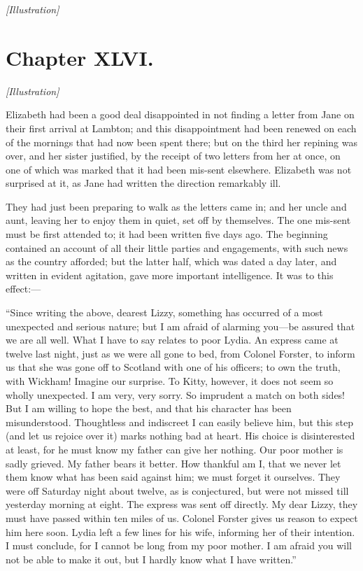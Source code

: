 \documentclass[12pt]{book}
\begin{document}
\emph{[Illustration]}

\chapter{Chapter XLVI.}

\emph{[Illustration]}

Elizabeth had been a good deal disappointed in not finding a letter from Jane on their first arrival at Lambton; and this disappointment had been renewed on each of the mornings that had now been spent there; but on the third her repining was over, and her sister justified, by the receipt of two letters from her at once, on one of which was marked that it had been mis-sent elsewhere. Elizabeth was not surprised at it, as Jane had written the direction remarkably ill.

They had just been preparing to walk as the letters came in; and her uncle and aunt, leaving her to enjoy them in quiet, set off by themselves. The one mis-sent must be first attended to; it had been written five days ago. The beginning contained an account of all their little parties and engagements, with such news as the country afforded; but the latter half, which was dated a day later, and written in evident agitation, gave more important intelligence. It was to this effect:---

``Since writing the above, dearest Lizzy, something has occurred of a most unexpected and serious nature; but I am afraid of alarming you---be assured that we are all well. What I have to say relates to poor Lydia. An express came at twelve last night, just as we were all gone to bed, from Colonel Forster, to inform us that she was gone off to Scotland with one of his officers; to own the truth, with Wickham! Imagine our surprise. To Kitty, however, it does not seem so wholly unexpected. I am very, very sorry. So imprudent a match on both sides! But I am willing to hope the best, and that his character has been misunderstood. Thoughtless and indiscreet I can easily believe him, but this step (and let us rejoice over it) marks nothing bad at heart. His choice is disinterested at least, for he must know my father can give her nothing. Our poor mother is sadly grieved. My father bears it better. How thankful am I, that we never let them know what has been said against him; we must forget it ourselves. They were off Saturday night about twelve, as is conjectured, but were not missed till yesterday morning at eight. The express was sent off directly. My dear Lizzy, they must have passed within ten miles of us. Colonel Forster gives us reason to expect him here soon. Lydia left a few lines for his wife, informing her of their intention. I must conclude, for I cannot be long from my poor mother. I am afraid you will not be able to make it out, but I hardly know what I have written.''
\end{document}
